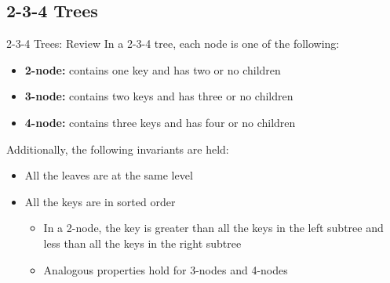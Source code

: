 \documentclass[9pt]{beamer}
\begin{document}
\subsection{2-3-4 Trees}
\begin{frame}[fragile]{2-3-4 Trees: Review}
  In a 2-3-4 tree, each node is one of the following:
  \begin{itemize}
    \item
      {\bf 2-node:} contains one key and has two or no children
    \item
      {\bf 3-node:} contains two keys and has three or no children
    \item
      {\bf 4-node:} contains three keys and has four or no children
  \end{itemize}

  \pause
  Additionally, the following invariants are held:
  \begin{itemize}
    \item
      All the leaves are at the same level
    \item
      All the keys are in sorted order
      \begin{itemize}
        \item
          In a 2-node, the key is greater than all the keys in the left
          subtree and less than all the keys in the right subtree
        \item
          Analogous properties hold for 3-nodes and 4-nodes
      \end{itemize}
  \end{itemize}
\end{frame}
\end{document}
